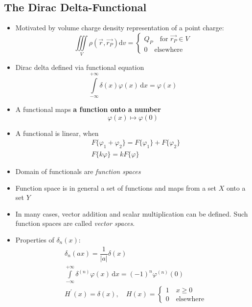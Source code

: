 \subsection{The Dirac Delta-Functional}
\begin{itemize}
  \item Motivated by volume charge density representation of a point charge:
      \begin{equation*}
        \iiint\limits_{V}\rho(\vec{r}, \vec{r_{P}})\mathrm{d}v =
        \begin{cases}
          Q_{P} \quad \text{for }\vec{r_{P}}\in V\\
          0 \quad \text{elsewhere}
        \end{cases}
      \end{equation*}
  \item Dirac delta defined via functional equation
        \begin{equation*}
\int\limits^{+\infty}_{-\infty}\delta(x)\varphi(x)\,\mathrm{d}x = \varphi(x)
        \end{equation*}
  \item A functional maps \textbf{a function onto a number}
        \begin{equation*}
\varphi(x) \mapsto \varphi(0)
        \end{equation*}
  \item A functional is linear, when
        \begin{align*}
&F\{\varphi_{1}+\varphi_{2}\} = F\{\varphi_{1}\} + F\{\varphi_{2}\}\\
&F\{k\varphi\} = kF\{\varphi\}
        \end{align*}
        \item Domain of functionals are \textit{function spaces}
        \item Function space is in general a set of functions and maps from a set $X$ onto a set $Y$
        \item In many cases, vector addition and scalar multiplication can be defined. Such function spaces are called \textit{vector spaces}.
        \item Properties of $\delta_{n}(x)$:
        \begin{align*}
          &\delta_{n}(ax) = \dfrac{1}{|a|} \delta(x)\\
          &\int\limits^{+\infty}_{-\infty}\delta^{(n)}\varphi(x)\,\mathrm{d}x = (-1)^{n}\varphi^{(n)}(0)\\
          &H^{\prime}(x) = \delta(x),\quad H(x) =
          \begin{cases}
            1 \quad x\geq0\\
            0 \quad \text{elsewhere}
          \end{cases}
        \end{align*}
\end{itemize}
